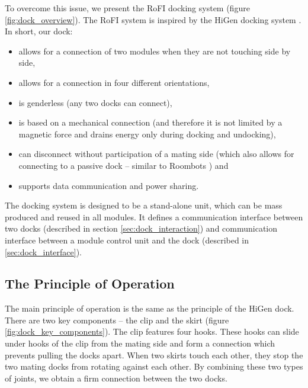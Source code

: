 To overcome this issue, we present the RoFI docking system (figure
\ref{fig:dock_overview}). The RoFI system is inspired by the HiGen docking
system \cite{parrott_higen:_2014}. In short, our dock:
\begin{itemize}
    \item allows for a connection of two modules when they are not touching side
    by side,
    \item allows for a connection in four different orientations,
    \item is genderless (any two docks can connect),
    \item is based on a mechanical connection (and therefore it is not
    limited by a magnetic force and drains energy only during docking and
    undocking),
    \item can disconnect without participation of a mating side (which also
    allows for connecting to a passive dock -- similar to Roombots
    \cite{bonardi_locomotion_2012}) and
    \item supports data communication and power sharing.
\end{itemize}

The docking system is designed to be a stand-alone unit, which can be mass
produced and reused in all modules. It defines a communication interface between
two docks (described in section \ref{sec:dock_interaction}) and communication
interface between a module control unit and the dock (described in
\ref{sec:dock_interface}).

\subsection{The Principle of Operation}

The main principle of operation is the same as the principle of the HiGen dock.
There are two key components -- the clip and the skirt (figure
\ref{fig:dock_key_components}). The clip features four hooks. These hooks can
slide under hooks of the clip from the mating side and form a connection which
prevents pulling the docks apart. When two skirts touch each other, they stop
the two mating docks from rotating against each other. By combining these two
types of joints, we obtain a firm connection between the two docks.

